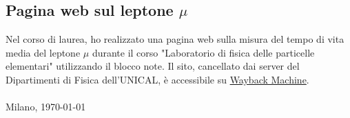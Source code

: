 \documentclass[a4paper,latin1,italian]{article}
\begin{document}
\subsection*{Pagina web sul leptone $\mu$}
Nel corso di laurea, ho realizzato una pagina web sulla misura del tempo di vita media del leptone $\mu$ durante il corso "Laboratorio di fisica delle particelle elementari" utilizzando il blocco note. Il sito, cancellato dai server del Dipartimenti di Fisica dell'UNICAL, \`e accessibile su \href{http://web.archive.org/web/20070207064033/http://www.fis.unical.it/gruppi/alteenergie/}{Wayback Machine}.\\\\
%
\vspace{2\baselineskip}
\noindent Milano, \today
\end{document}
